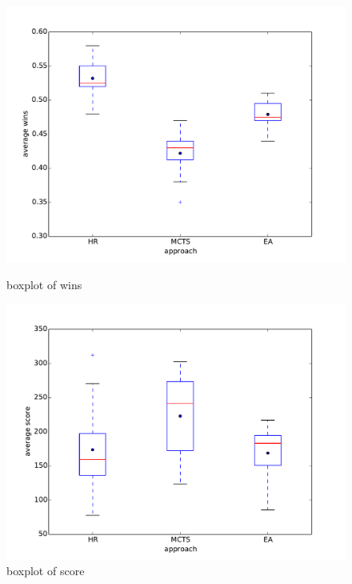\begin{figure}
\begin{minipage}{.5\textwidth}
\centering
\includegraphics[scale=0.3]{images/eval_all_wins.pdf}
\caption{boxplot of wins}
\label{fig:eval_all_wins}
\end{minipage}%
\begin{minipage}{.5\textwidth}
\centering
\includegraphics[scale=0.3]{images/eval_all_score.pdf}
\caption{boxplot of score}
\label{fig:eval_all_score}
\end{minipage}
\end{figure}




